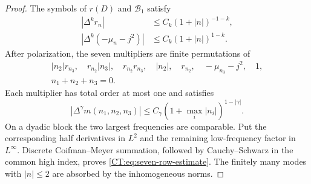 \documentclass[11pt]{amsart}
\numberwithin{equation}{section}
\theoremstyle{definition}
\theoremstyle{remark}
\begin{document}
\begin{proof}
The symbols of $r(D)$ and $\mathcal B_1$ satisfy
\begin{align*}
 |\Delta^kr_n|&\le C_k(1+|n|)^{-1-k},\\
 |\Delta^k(-\mu_n-j^2)|&\le C_k(1+|n|)^{1-k}.
\end{align*}
After polarization, the seven multipliers are finite permutations of
\begin{multline}\label{CT:eq:seven-symbols}
 |n_2|r_{n_3},\quad r_{n_2}|n_3|,\quad
 r_{n_2}r_{n_3},\quad |n_2|,\quad r_{n_2},\quad
 -\mu_{n_3}-j^2,\quad1,\\
 n_1+n_2+n_3=0.
\end{multline}
Each multiplier has total order at most one and satisfies
\begin{equation*}
 |\Delta^\gamma m(n_1,n_2,n_3)|
 \le C_\gamma(1+\max_i|n_i|)^{1-|\gamma|}.
\end{equation*}
On a dyadic block the two largest frequencies are comparable.  Put the
corresponding half derivatives in $L^2$ and the remaining low-frequency
factor in $L^\infty$.  Discrete Coifman--Meyer summation, followed by
Cauchy--Schwarz in the common high index, proves
\eqref{CT:eq:seven-row-estimate}.  The finitely many modes with
$|n|\le2$ are absorbed by the inhomogeneous norms.
\end{proof}
\end{document}
